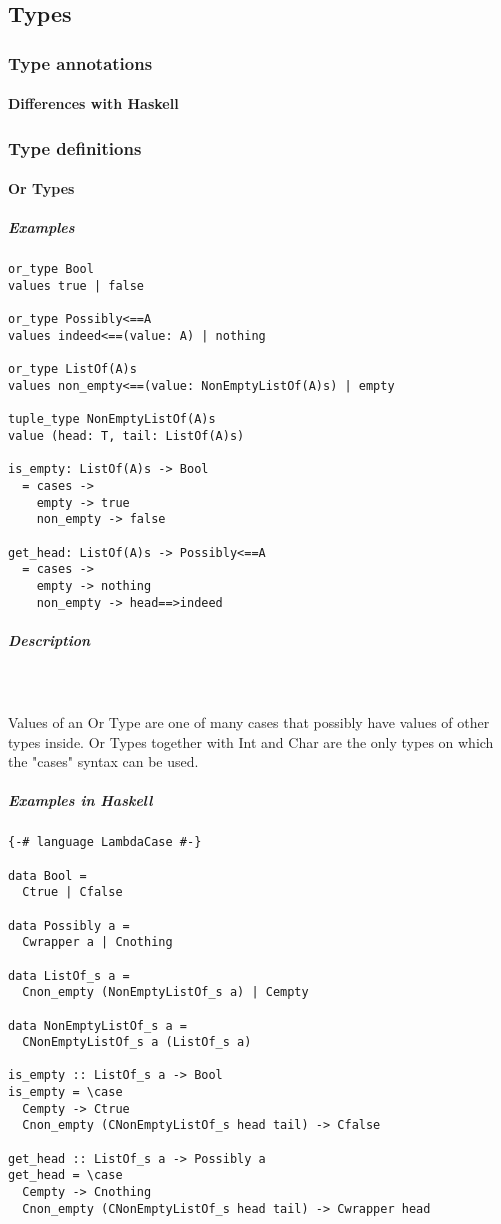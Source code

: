 \documentclass{article}
\def\H{Haskell}
\begin{document}
\subsection{Types}

\subsubsection{Type annotations}

\paragraph{Differences with Haskell}

\subsubsection{Type definitions}

\paragraph{Or Types}

\subparagraph{Examples}

\begin{verbatim}
or_type Bool
values true | false

or_type Possibly<==A
values indeed<==(value: A) | nothing

or_type ListOf(A)s
values non_empty<==(value: NonEmptyListOf(A)s) | empty

tuple_type NonEmptyListOf(A)s
value (head: T, tail: ListOf(A)s)

is_empty: ListOf(A)s -> Bool
  = cases -> 
    empty -> true
    non_empty -> false

get_head: ListOf(A)s -> Possibly<==A
  = cases -> 
    empty -> nothing
    non_empty -> head==>indeed
\end{verbatim}

\subparagraph{Description}\mbox{} \\\\
Values of an Or Type are one of many cases that possibly have values of other types
inside. Or Types together with Int and Char are the only types on which the "cases"
syntax can be used.

\subparagraph{Examples in \H}

\begin{verbatim}
{-# language LambdaCase #-}

data Bool =
  Ctrue | Cfalse

data Possibly a =
  Cwrapper a | Cnothing

data ListOf_s a =
  Cnon_empty (NonEmptyListOf_s a) | Cempty

data NonEmptyListOf_s a =
  CNonEmptyListOf_s a (ListOf_s a)

is_empty :: ListOf_s a -> Bool
is_empty = \case
  Cempty -> Ctrue
  Cnon_empty (CNonEmptyListOf_s head tail) -> Cfalse

get_head :: ListOf_s a -> Possibly a
get_head = \case
  Cempty -> Cnothing
  Cnon_empty (CNonEmptyListOf_s head tail) -> Cwrapper head
\end{verbatim}
\end{document}
